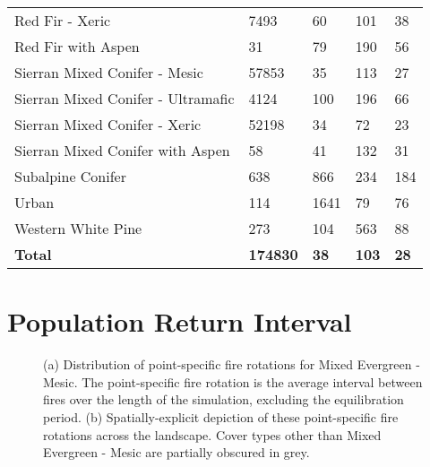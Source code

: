 \begin{table}[!htbp]
\begin{tabular}{@{}lllll@{}}
Red Fir - Xeric                              & 7493     & 60        & 101      & 38  \\
Red Fir with Aspen                           & 31       & 79        & 190      & 56  \\
Sierran Mixed Conifer - Mesic                & 57853    & 35        & 113      & 27  \\
Sierran Mixed Conifer - Ultramafic           & 4124     & 100       & 196      & 66  \\
Sierran Mixed Conifer - Xeric                & 52198    & 34        & 72       & 23  \\
Sierran Mixed Conifer with Aspen             & 58       & 41        & 132      & 31  \\
Subalpine Conifer                            & 638      & 866       & 234      & 184 \\
Urban                                        & 114      & 1641      & 79       & 76  \\
Western White Pine                           & 273      & 104       & 563      & 88  \\
\textbf{Total}       			& \textbf{174830}    & \textbf{38}   & \textbf{103}   & \textbf{28}                                                                                \\ \bottomrule
\end{tabular}
\end{table}



\section{Population Return Interval}

\begin{figure}[!htbp]
  \centering
  \caption{(a) Distribution of point-specific fire rotations for Mixed Evergreen - Mesic. The point-specific fire rotation is the average interval between fires over the length of the simulation, excluding the equilibration period. (b) Spatially-explicit depiction of these point-specific fire rotations across the landscape. Cover types other than Mixed Evergreen - Mesic are partially obscured in grey.}
    \label{fig:preturn_megm}
\end{figure}


